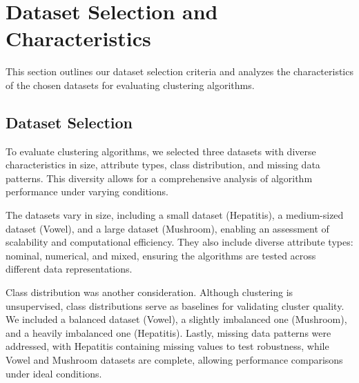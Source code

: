 \section{Dataset Selection and Characteristics}
\label{sec:dataset}

This section outlines our dataset selection criteria and analyzes the characteristics of the chosen datasets for evaluating clustering algorithms.

\subsection{Dataset Selection}

To evaluate clustering algorithms, we selected three datasets with diverse characteristics in size, attribute types, class distribution, and missing data patterns. This diversity allows for a comprehensive analysis of algorithm performance under varying conditions.

The datasets vary in size, including a small dataset (Hepatitis), a medium-sized dataset (Vowel), and a large dataset (Mushroom), enabling an assessment of scalability and computational efficiency. They also include diverse attribute types: nominal, numerical, and mixed, ensuring the algorithms are tested across different data representations.

Class distribution was another consideration. Although clustering is unsupervised, class distributions serve as baselines for validating cluster quality. We included a balanced dataset (Vowel), a slightly imbalanced one (Mushroom), and a heavily imbalanced one (Hepatitis). Lastly, missing data patterns were addressed, with Hepatitis containing missing values to test robustness, while Vowel and Mushroom datasets are complete, allowing performance comparisons under ideal conditions.




